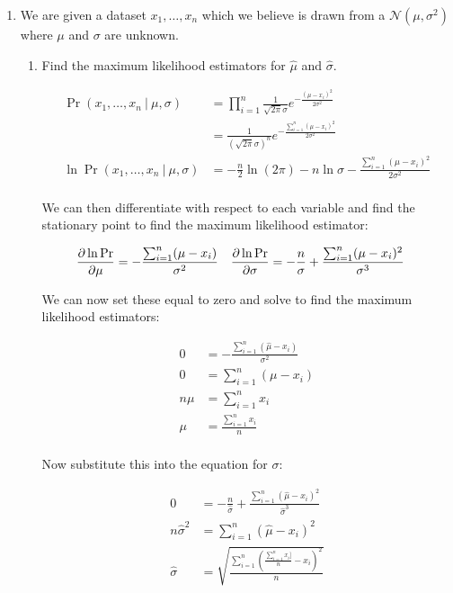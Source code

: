 \documentclass[10pt,\jkfside,a4paper]{article}
\begin{document}
\begin{enumerate}
\item We are given a dataset $x_1, \dots, x_n$ which we believe is drawn
from a $\mathcal{N}(\mu, \sigma^2)$ where $\mu$ and $\sigma$ are unknown.

\begin{enumerate}

\item Find the maximum likelihood estimators for $\hat{\mu}$ and
$\hat{\sigma}$.

\iffalse

\[
\begin{split}
\Pr(x_1, \dots, x_n \ | \ \mu, \sigma)
&= \prod^n_{i=1} \frac{1}{\sqrt{2\pi}\sigma} e^{-\frac{(\mu - x_i)
^2}{2\sigma^2}} \\
&= \frac{1}{\left(\sqrt{2\pi}\sigma\right)^n}
e^{-\frac{\sum^n_{i=1}(\mu - x_i)^2}{2\sigma^2}} \\
\ln \Pr(x_1, \dots, x_n \ | \ \mu, \sigma)
&= -\frac{n}{2}\ln(2\pi) - n\ln \sigma -\frac{\sum^n_{i=1}(\mu - x_i)^2}{2\sigma^2} \\
\end{split}
\]

We can then differentiate with respect to each variable and find the
stationary point to find the maximum likelihood estimator:

\begin{align*}
\pdv{\ln \Pr}{\mu}
&= -\frac{\sum^n_{i=1}(\mu - x_i)}{\sigma^2}
&
\pdv{\ln\Pr}{\sigma}
&= -\frac{n}{\sigma} + \frac{\sum^n_{i=1}(\mu - x_i)^2}{\sigma^3}
\end{align*}

We can now set these equal to zero and solve to find the maximum likelihood
estimators:

\[
\begin{split}
0 &= -\frac{\sum^n_{i=1}(\hat{\mu} - x_i)}{\sigma^2} \\
0 &= \sum^n_{i=1}(\mu - x_i) \\
n\mu &= \sum^n_{i=1}x_i \\
\mu &= \frac{\sum^n_{i=1}x_i}{n} \\
\end{split}
\]

Now substitute this into the equation for $\sigma$:

\[
\begin{split}
0 &= -\frac{n}{\hat{\sigma}} + \frac{\sum^n_{i=1}(\hat{\mu} - x_i)^2}
{\hat{\sigma}^3} \\
n\hat{\sigma}^2 &= \sum^n_{i=1}(\hat{\mu} - x_i)^2 \\
\hat{\sigma} &= \sqrt{\frac{\sum^n_{i=1}\left(\frac{\sum^n_{i=1}x_i]}{n} -
x_i\right)^2}{n}} \\
\end{split}
\]


\end{enumerate}
\end{enumerate}
\end{document}
